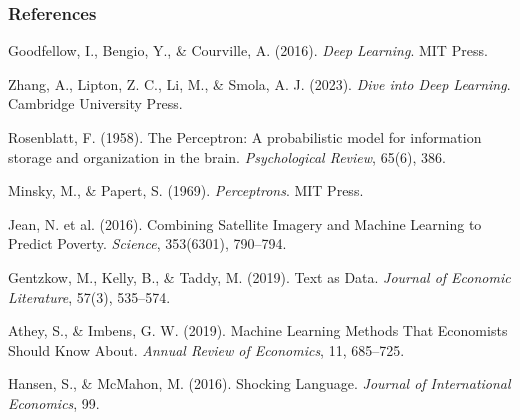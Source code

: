 \documentclass[notes,11pt, aspectratio=169]{beamer}
\newenvironment{wideitemize}{\itemize\addtolength{\itemsep}{10pt}}{\enditemize}
\begin{document}
\begin{frame}
\frametitle{References}

\small
\begin{wideitemize}
    \item Goodfellow, I., Bengio, Y., \& Courville, A. (2016). \textit{Deep Learning}. MIT Press.
    \item Zhang, A., Lipton, Z. C., Li, M., \& Smola, A. J. (2023). \textit{Dive into Deep Learning}. Cambridge University Press.
    \item Rosenblatt, F. (1958). The Perceptron: A probabilistic model for information storage and organization in the brain. \textit{Psychological Review}, 65(6), 386.
    \item Minsky, M., \& Papert, S. (1969). \textit{Perceptrons}. MIT Press.
    \item Jean, N. et al. (2016). Combining Satellite Imagery and Machine Learning to Predict Poverty. \textit{Science}, 353(6301), 790--794.
    \item Gentzkow, M., Kelly, B., \& Taddy, M. (2019). Text as Data. \textit{Journal of Economic Literature}, 57(3), 535--574.
    \item Athey, S., \& Imbens, G. W. (2019). Machine Learning Methods That Economists Should Know About. \textit{Annual Review of Economics}, 11, 685--725.
    \item Hansen, S., \& McMahon, M. (2016). Shocking Language. \textit{Journal of International Economics}, 99.
\end{wideitemize}
\end{frame}
\end{document}
